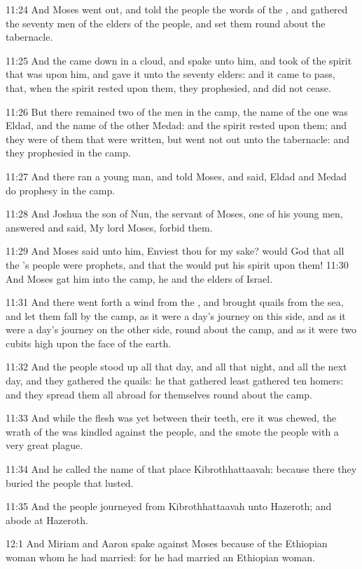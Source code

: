 11:24 And Moses went out, and told the people the words of the \LORD,
and gathered the seventy men of the elders of the people, and set them
round about the tabernacle.

11:25 And the \LORD came down in a cloud, and spake unto him, and took
of the spirit that was upon him, and gave it unto the seventy elders:
and it came to pass, that, when the spirit rested upon them, they
prophesied, and did not cease.

11:26 But there remained two of the men in the camp, the name of the
one was Eldad, and the name of the other Medad: and the spirit rested
upon them; and they were of them that were written, but went not out
unto the tabernacle: and they prophesied in the camp.

11:27 And there ran a young man, and told Moses, and said, Eldad and
Medad do prophesy in the camp.

11:28 And Joshua the son of Nun, the servant of Moses, one of his
young men, answered and said, My lord Moses, forbid them.

11:29 And Moses said unto him, Enviest thou for my sake? would God
that all the \LORD's people were prophets, and that the \LORD would put
his spirit upon them!  11:30 And Moses gat him into the camp, he and
the elders of Israel.

11:31 And there went forth a wind from the \LORD, and brought quails
from the sea, and let them fall by the camp, as it were a day's
journey on this side, and as it were a day's journey on the other
side, round about the camp, and as it were two cubits high upon the
face of the earth.

11:32 And the people stood up all that day, and all that night, and
all the next day, and they gathered the quails: he that gathered least
gathered ten homers: and they spread them all abroad for themselves
round about the camp.

11:33 And while the flesh was yet between their teeth, ere it was
chewed, the wrath of the \LORD was kindled against the people, and the
\LORD smote the people with a very great plague.

11:34 And he called the name of that place Kibrothhattaavah: because
there they buried the people that lusted.

11:35 And the people journeyed from Kibrothhattaavah unto Hazeroth;
and abode at Hazeroth.

12:1 And Miriam and Aaron spake against Moses because of the Ethiopian
woman whom he had married: for he had married an Ethiopian woman.

